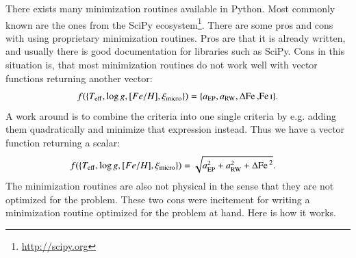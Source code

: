 \documentclass{aa}
\begin{document}
There exists many minimization routines available in Python. Most commonly known
are the ones from the SciPy ecosystem\footnote{\url{http://scipy.org}}. There
are some pros and cons with using proprietary minimization routines. Pros are
that it is already written, and usually there is good documentation for
libraries such as SciPy. Cons in this situation is, that most minimization
routines do not work well with vector functions returning another vector:
\begin{align}
    f(\{T_\mathrm{eff}, \log g, [Fe/H], \xi_\mathrm{micro}\}) = \{a_\mathrm{EP}, a_\mathrm{RW}, \Delta\ion{Fe}, \ion{Fe}{I}\}.
\end{align}
A work around is to combine the criteria into one single criteria by e.g. adding
them quadratically and minimize that expression instead. Thus we have a vector
function returning a scalar:
\begin{align}
    f(\{T_\mathrm{eff}, \log g, [Fe/H], \xi_\mathrm{micro}\}) &= \sqrt{a_\mathrm{EP}^2 + a_\mathrm{RW}^2 + \Delta\ion{Fe}{}^2}.
\end{align}
The minimization routines are also not physical in the sense that they are not
optimized for the problem. These two cons were incitement for writing a
minimization routine optimized for the problem at hand. Here is how it works.
\end{document}
